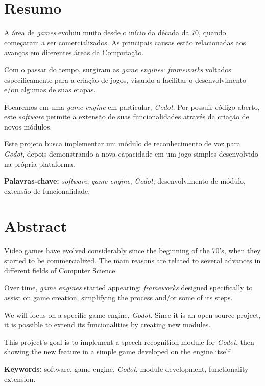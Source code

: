 
\chapter*{Resumo}

A área de \emph{games} evoluiu muito desde o início da década da 70, quando começaram
a ser comercializados. As principais causas estão relacionadas aos avanços em
diferentes áreas da Computação.

Com o passar do tempo, surgiram as \emph{game engines}: \emph{frameworks} voltados
especificamente para a criação de jogos, visando a facilitar o desenvolvimento e/ou
algumas de suas etapas.

Focaremos em uma \emph{game engine} em particular, \emph{Godot}. Por possuir código
aberto, este \emph{software} permite a extensão de suas funcionalidades através da
criação de novos módulos.

Este projeto busca implementar um módulo de reconhecimento de voz para \emph{Godot},
depois demonstrando a nova capacidade em um jogo simples desenvolvido na própria
plataforma.
\par
\bigskip
\noindent \textbf{Palavras-chave:} \emph{software}, \emph{game engine}, \emph{Godot},
desenvolvimento de módulo, extensão de funcionalidade.


\chapter*{Abstract}

Video games have evolved considerably since the beginning of the 70's, when they
started to be commercialized. The main reasons are related to several advances in
different fields of Computer Science.

Over time, \emph{game engines} started appearing: \emph{frameworks} designed
specifically to assist on game creation, simplifying the process and/or some of its
steps.

We will focus on a specific game engine, \emph{Godot}. Since it is an open source
project, it is possible to extend its funcionalities by creating new modules.

This project's goal is to implement a speech recognition module for \emph{Godot},
then showing the new feature in a simple game developed on the engine itself.
\par
\bigskip
\noindent \textbf{Keywords:} software, game engine, \emph{Godot}, module development,
functionality extension.

